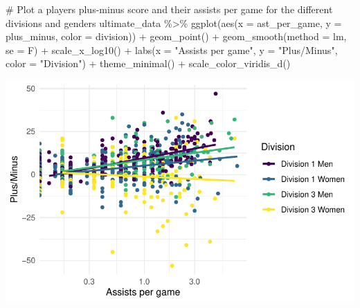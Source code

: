 \documentclass[
  letterpaper,
  DIV=11,
  numbers=noendperiod]{scrartcl}
\newenvironment{Shaded}{\begin{snugshade}}{\end{snugshade}}
\newcommand{\AttributeTok}[1]{\textcolor[rgb]{0.40,0.45,0.13}{#1}}
\newcommand{\CommentTok}[1]{\textcolor[rgb]{0.37,0.37,0.37}{#1}}
\newcommand{\FunctionTok}[1]{\textcolor[rgb]{0.28,0.35,0.67}{#1}}
\newcommand{\NormalTok}[1]{\textcolor[rgb]{0.00,0.23,0.31}{#1}}
\newcommand{\SpecialCharTok}[1]{\textcolor[rgb]{0.37,0.37,0.37}{#1}}
\newcommand{\StringTok}[1]{\textcolor[rgb]{0.13,0.47,0.30}{#1}}
\begin{document}
\begin{Shaded}
\begin{Highlighting}[]
\CommentTok{\# Plot a player\textquotesingle{}s plus{-}minus score and their assists per game for the different divisions and genders}
\NormalTok{ultimate\_data }\SpecialCharTok{\%\textgreater{}\%} \FunctionTok{ggplot}\NormalTok{(}\FunctionTok{aes}\NormalTok{(}\AttributeTok{x =}\NormalTok{ ast\_per\_game, }\AttributeTok{y =}\NormalTok{ plus\_minus, }\AttributeTok{color =}\NormalTok{ division)) }\SpecialCharTok{+} 
   \FunctionTok{geom\_point}\NormalTok{() }\SpecialCharTok{+} \FunctionTok{geom\_smooth}\NormalTok{(}\AttributeTok{method =} \StringTok{\textquotesingle{}lm\textquotesingle{}}\NormalTok{, }\AttributeTok{se =}\NormalTok{ F) }\SpecialCharTok{+} \FunctionTok{scale\_x\_log10}\NormalTok{() }\SpecialCharTok{+}
  \FunctionTok{labs}\NormalTok{(}\AttributeTok{x =} \StringTok{"Assists per game"}\NormalTok{, }\AttributeTok{y =} \StringTok{"Plus/Minus"}\NormalTok{, }\AttributeTok{color =} \StringTok{"Division"}\NormalTok{) }\SpecialCharTok{+} \FunctionTok{theme\_minimal}\NormalTok{() }\SpecialCharTok{+}
  \FunctionTok{scale\_color\_viridis\_d}\NormalTok{()}
\end{Highlighting}
\end{Shaded}

\includegraphics{final_eda_files/figure-pdf/plus-minus-&-other-variable-4.pdf}
\end{document}
